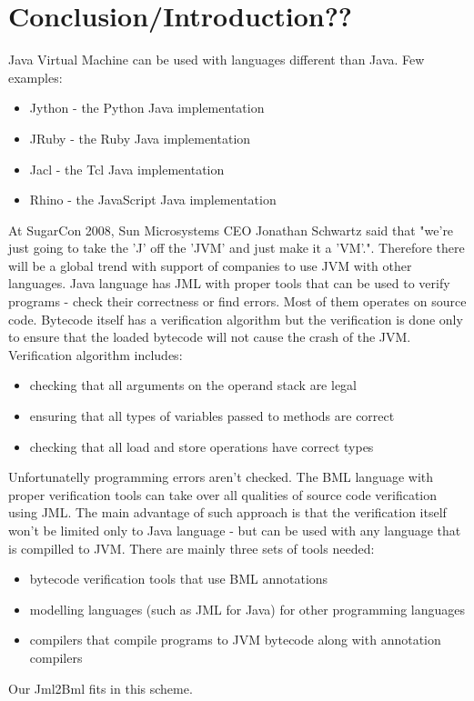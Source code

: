 \documentclass{acm_proc_article-sp}
\begin{document}
\section{Conclusion/Introduction??}
Java Virtual Machine can be used with languages different than Java. Few examples:
\begin{itemize}
	\item Jython - the Python Java implementation
	\item JRuby - the Ruby Java implementation
	\item Jacl - the Tcl Java implementation
	\item Rhino - the JavaScript Java implementation
\end{itemize}
At SugarCon 2008, Sun Microsystems CEO Jonathan Schwartz said that "we're just going to take the 'J' off the 'JVM' and just make it a 'VM'.". Therefore there will be a global trend with support of companies to use JVM with other languages. Java language has JML with proper tools that can be used to verify programs - check their correctness or find errors. Most of them operates on source code. Bytecode itself has a verification algorithm but the verification is done only to ensure that the loaded bytecode will not cause the crash of the JVM. Verification algorithm includes:
\begin{itemize}
	\item checking that all arguments on the operand stack are legal
	\item ensuring that all types of variables passed to methods are correct
	\item checking that all load and store operations have correct types
\end{itemize}
Unfortunatelly programming errors aren't checked. The BML language with proper verification tools can take over all qualities of source code verification using JML. The main advantage of such approach is that the verification itself won't be limited only to Java language - but can be used with any language that is compilled to JVM. There are mainly three sets of tools needed:
\begin{itemize}
	\item bytecode verification tools that use BML annotations
	\item modelling languages (such as JML for Java) for other programming languages
	\item compilers that compile programs to JVM bytecode along with annotation compilers
\end{itemize}
Our Jml2Bml fits in this scheme.
\end{document}
